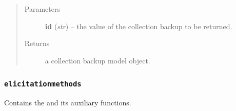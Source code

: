 \documentclass[letterpaper,10pt,english]{sphinxmanual}
\begin{document}
\begin{fulllineitems}
\begin{fulllineitems}
\begin{quote}
\begin{description}
\item[{Parameters}] \leavevmode
\textbf{id} (\emph{str}) -- the  value of the collection backup to be returned.

\item[{Returns}] \leavevmode
a collection backup model object.

\end{description}\end{quote}

\end{fulllineitems}


\end{fulllineitems}



\subsubsection{\texttt{elicitationmethods}}
\label{api:module-onlinelinguisticdatabase.controllers.elicitationmethods}\label{api:elicitationmethods}
Contains the {\hyperref[api:onlinelinguisticdatabase.controllers.elicitationmethods.ElicitationmethodsController]{}} and its auxiliary functions.
\label{api:module-elicitationmethods}
\end{document}
